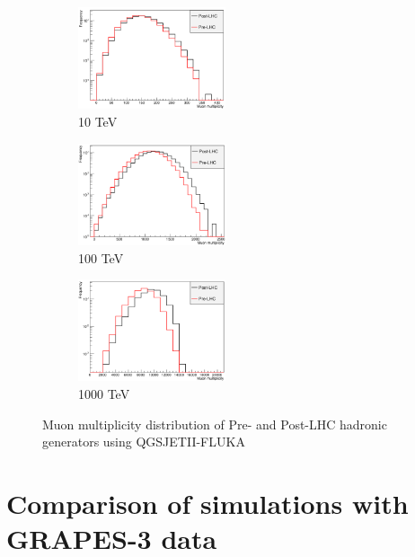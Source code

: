 \documentclass[12pt]{article}
\begin{document}
\begin{figure}
\begin{subfigure}{0.32\textwidth}
\includegraphics[width=0.9\linewidth, height=3cm]{qgsii-lhc-mm10} 
\caption{10 TeV}
\label{fig:qgsii-lhc-mm10}
\end{subfigure}
\begin{subfigure}{0.32\textwidth}
\includegraphics[width=0.9\linewidth, height=3cm]{qgsii-lhc-mm100} 
\caption{100 TeV}
\label{fig:qgsii-lhc-mm100}
\end{subfigure}
\begin{subfigure}{0.32\textwidth}
\includegraphics[width=0.9\linewidth, height = 3cm]{qgsii-lhc-mm1000} 
\caption{1000 TeV}
\label{fig:qgsii-lhc-mm1000}
\end{subfigure}
\caption{Muon multiplicity distribution of Pre- and Post-LHC hadronic generators using QGSJETII-FLUKA}
\label{fig:lhc_multiplicity_qgsii}
\end{figure}

\section{Comparison of simulations with GRAPES-3 data}
\end{document}
